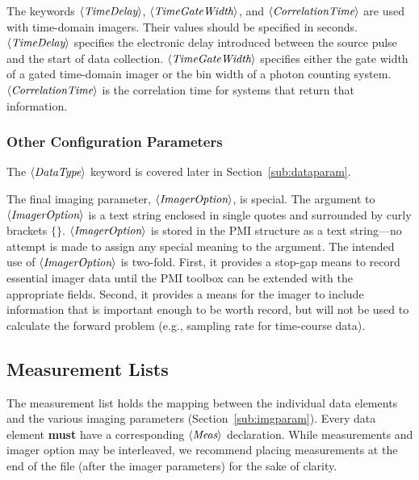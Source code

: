 \documentclass[12pt]{article}
\newcommand{\keyword}[1]{\mbox{$\left<\mbox{\it #1}\right>$}\/}
\begin{document}
The keywords \keyword{TimeDelay}, \keyword{TimeGateWidth}, and
\keyword{CorrelationTime} are used with time-domain imagers.  Their
values should be specified in seconds.  \keyword{TimeDelay} specifies
the electronic delay introduced between the source pulse and the start
of data collection.  \keyword{TimeGateWidth} specifies either the gate width
of a gated time-domain imager or the bin width of a photon counting
system.  \keyword{CorrelationTime} is the correlation time for systems
that return that information.

\subsubsection{Other Configuration Parameters}

The \keyword{DataType} keyword is covered later in
Section~\ref{sub:dataparam}.

The final imaging parameter, \keyword{ImagerOption}, is special.  The
argument to \keyword{ImagerOption} is a text string enclosed in single
quotes and surrounded by curly brackets $\{\}$.
\keyword{ImagerOption} is stored in the PMI structure as a text
string---no attempt is made to assign any special meaning to the
argument.  The intended use of \keyword{ImagerOption} is two-fold.
First, it provides a stop-gap means to record essential imager data
until the PMI toolbox can be extended with the appropriate fields.
Second, it provides a means for the imager to include information that
is important enough to be worth record, but will not be used to
calculate the forward problem (e.g., sampling rate for time-course
data).


\subsection{Measurement Lists}
\label{sub:measlist}

The measurement list holds the mapping between the individual data
elements and the various imaging parameters
(Section~\ref{sub:imgparam}).  Every data element {\bf must} have a
corresponding \keyword{Meas} declaration.  While measurements and
imager option may be interleaved, we recommend placing measurements at
the end of the file (after the imager parameters) for the sake of
clarity.
\end{document}
